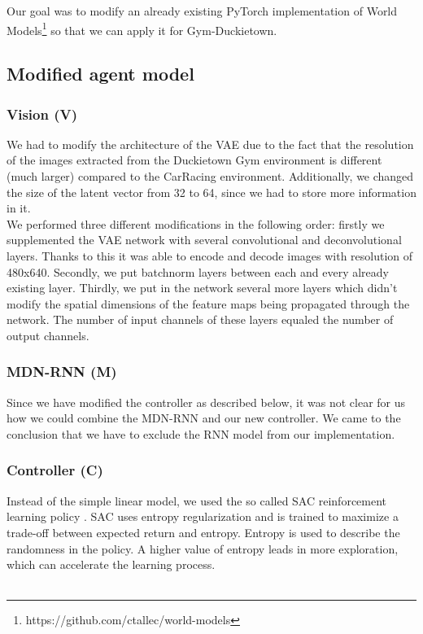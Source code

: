 \documentclass{article}
\begin{document}
Our goal was to modify an already existing PyTorch implementation of World Models\footnote{https://github.com/ctallec/world-models} so that we can apply it for Gym-Duckietown.

\subsection{Modified agent model}

\subsubsection{Vision (V)}
We had to modify the architecture of the VAE due to the fact that the resolution of the images extracted from the Duckietown Gym environment is different (much larger) compared to the CarRacing environment. Additionally, we changed the size of the latent vector from 32 to 64, since we had to store more information in it.\\
We performed three different modifications in the following order: firstly we supplemented the VAE network with several convolutional and deconvolutional layers. Thanks to this it was able to encode and decode images with resolution of 480x640. Secondly, we put batchnorm layers between each and every already existing layer. Thirdly, we put in the network several more layers which didn't modify the spatial dimensions of the feature maps being propagated through the network. The number of input channels of these layers equaled the number of output channels.

\subsubsection{MDN-RNN (M)}
Since we have modified the controller as described below, it was not clear for us how we could combine the MDN-RNN and our new controller. We came to the conclusion that we have to exclude the RNN model from our implementation.

\subsubsection{Controller (C)}
Instead of the simple linear model, we used the so called SAC reinforcement learning policy \cite{sac}. SAC uses entropy regularization and is trained to maximize a trade-off between expected return and entropy. Entropy is used to describe the randomness in the policy. A higher value of entropy leads in more exploration, which can accelerate the learning process.\\\\
\end{document}
